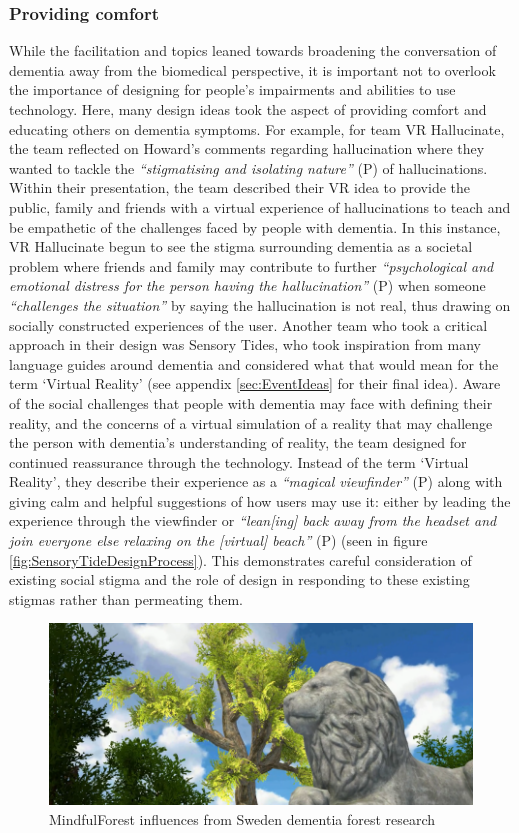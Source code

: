 \subsubsection{Providing comfort}
\label{ThemeThree:SubThemeOne}
While the facilitation and topics leaned towards broadening the conversation of dementia away from the biomedical perspective, it is important not to overlook the importance of designing for people’s impairments and abilities to use technology. Here, many design ideas took the aspect of providing comfort and educating others on dementia symptoms. For example, for team VR Hallucinate, the team reflected on Howard’s comments regarding hallucination where they wanted to tackle the \textit{``stigmatising and isolating nature''} (P) of hallucinations. Within their presentation, the team described their VR idea to provide the public, family and friends with a virtual experience of hallucinations to teach and be empathetic of the challenges faced by people with dementia. In this instance, VR Hallucinate begun to see the stigma surrounding dementia as a societal problem where friends and family may contribute to further \textit{``psychological and emotional distress for the person having the hallucination''} (P) when someone \textit{``challenges the situation''} by saying the hallucination is not real, thus drawing on socially constructed experiences of the user. Another team who took a critical approach in their design was Sensory Tides, who took inspiration from many language guides around dementia and considered what that would mean for the term `Virtual Reality' (see appendix \ref{sec:EventIdeas} for their final idea). Aware of the social challenges that people with dementia may face with defining their reality, and the concerns of a virtual simulation of a reality that may challenge the person with dementia’s understanding of reality, the team designed for continued reassurance through the technology. Instead of the term `Virtual Reality', they describe their experience as a \textit{``magical viewfinder''} (P) along with giving calm and helpful suggestions of how users may use it: either by leading the experience through the viewfinder or \textit{``lean[ing] back away from the headset and join everyone else relaxing on the [virtual] beach''} (P) (seen in figure \ref{fig:SensoryTideDesignProcess}). This demonstrates careful consideration of existing social stigma and the role of design in responding to these existing stigmas rather than permeating them. 


\begin{figure}[htp]
\centering
\includegraphics[width=.8\linewidth]{Images/DemVR/Findings/MindfulForest.png}
\caption{MindfulForest influences from Sweden dementia forest research}
\label{fig:MindFulForestResearch}
\end{figure}

